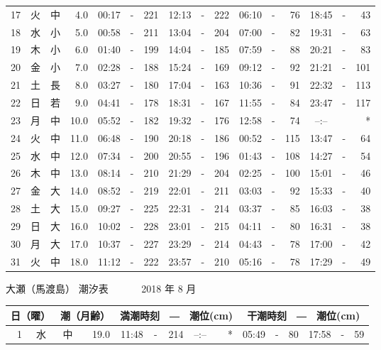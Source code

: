 \documentclass[12pt.a4j]{jsarticle}
\begin{document}
\begin{center}
\begin{table}[ht]
\begin{tabular}{|rc|cr|ccrccr|ccrccr|}
17 & 火 & 中 &  4.0 & 00:17 &-& 221 & 12:13 &-& 222 & 06:10 &-&  76 & 18:45 &-&  43 \\
18 & 水 & 小 &  5.0 & 00:58 &-& 211 & 13:04 &-& 204 & 07:00 &-&  82 & 19:31 &-&  63 \\
19 & 木 & 小 &  6.0 & 01:40 &-& 199 & 14:04 &-& 185 & 07:59 &-&  88 & 20:21 &-&  83 \\
20 & 金 & 小 &  7.0 & 02:28 &-& 188 & 15:24 &-& 169 & 09:12 &-&  92 & 21:21 &-& 101 \\
21 & 土 & 長 &  8.0 & 03:27 &-& 180 & 17:04 &-& 163 & 10:36 &-&  91 & 22:32 &-& 113 \\
22 & 日 & 若 &  9.0 & 04:41 &-& 178 & 18:31 &-& 167 & 11:55 &-&  84 & 23:47 &-& 117 \\
23 & 月 & 中 & 10.0 & 05:52 &-& 182 & 19:32 &-& 176 & 12:58 &-&  74 & --:-- & &  *  \\
24 & 火 & 中 & 11.0 & 06:48 &-& 190 & 20:18 &-& 186 & 00:52 &-& 115 & 13:47 &-&  64 \\
25 & 水 & 中 & 12.0 & 07:34 &-& 200 & 20:55 &-& 196 & 01:43 &-& 108 & 14:27 &-&  54 \\
26 & 木 & 中 & 13.0 & 08:14 &-& 210 & 21:29 &-& 204 & 02:25 &-& 100 & 15:01 &-&  46 \\
27 & 金 & 大 & 14.0 & 08:52 &-& 219 & 22:01 &-& 211 & 03:03 &-&  92 & 15:33 &-&  40 \\
28 & 土 & 大 & 15.0 & 09:27 &-& 225 & 22:31 &-& 214 & 03:37 &-&  85 & 16:03 &-&  38 \\
29 & 日 & 大 & 16.0 & 10:02 &-& 228 & 23:01 &-& 215 & 04:11 &-&  80 & 16:31 &-&  38 \\
30 & 月 & 大 & 17.0 & 10:37 &-& 227 & 23:29 &-& 214 & 04:43 &-&  78 & 17:00 &-&  42 \\
31 & 火 & 中 & 18.0 & 11:12 &-& 222 & 23:57 &-& 210 & 05:16 &-&  78 & 17:29 &-&  49 \\
\hline
\end{tabular}
\end{table}
\newpage
{\LARGE 大瀬（馬渡島）  潮汐表　　　}
{\large 2018 年  8 月}\\
\begin{table}[ht]
\begin{tabular}{|rc|cr|ccrccr|ccrccr|}
\hline
\multicolumn{2}{|c|}{日（曜）} & \multicolumn{2}{c|}{潮（月齢）} & \multicolumn{6}{c|}{満潮時刻　―　潮位(cm)} & \multicolumn{6}{c|}{干潮時刻　―　潮位(cm)} \\
\hline
 1 & 水 & 中 & 19.0 & 11:48 &-& 214 & --:-- & &  *  & 05:49 &-&  80 & 17:58 &-&  59 \\

\end{tabular}
\end{table}
\end{center}
\end{document}
